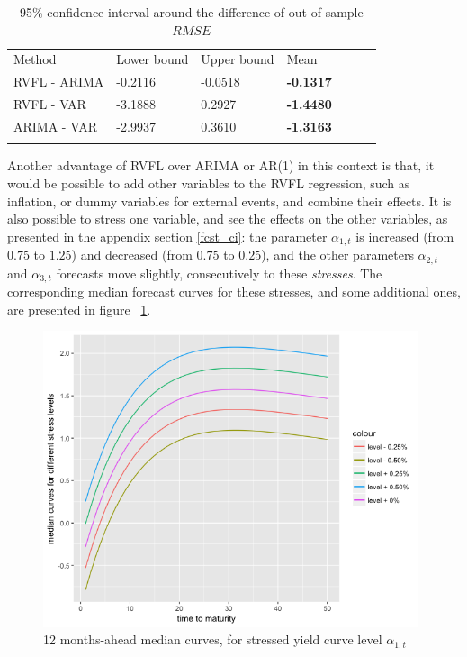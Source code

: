 \begin{table}
\begin{center}
\caption{95\% confidence interval around the difference of out-of-sample $RMSE$}
\label{tab:confint}       %
\begin{tabular}{lllllll}
\hline\noalign{\smallskip}
Method & Lower bound & Upper bound  & Mean \\
\noalign{\smallskip}\hline\noalign{\smallskip}
  RVFL - ARIMA & -0.2116 & -0.0518 & \textbf{-0.1317}\\
  RVFL - VAR & -3.1888 & 0.2927 & \textbf{-1.4480} \\
  ARIMA - VAR & -2.9937 & 0.3610 & \textbf{-1.3163} \\
\noalign{\smallskip}\hline
\end{tabular}
\end{center}
\end{table}

\medskip

Another advantage of RVFL over ARIMA or AR(1) in this context is that, it would be possible to add other variables to the RVFL regression, such as inflation, or dummy variables for external events, and combine their effects. It is also possible to stress one variable, and see the effects on the other variables, as presented in the appendix section \ref{fcst_ci}: the parameter $\alpha_{1, t}$ is increased (from $0.75$ to $1.25$) and decreased (from $0.75$ to $0.25$), and the other parameters $\alpha_{2, t}$ and $\alpha_{3, t}$ forecasts move slightly, consecutively to these \textit{stresses}. The corresponding median forecast curves for these stresses, and some additional ones, are presented in figure ~\ref{stressed_NS2}.

\begin{figure}
\centering
\includegraphics[width=11cm]{gfx/chapter-rvfl-mts/stressed_NS.png}
\caption{12 months-ahead median curves, for stressed yield curve level $\alpha_{1, t}$}
\label{stressed_NS2}
\end{figure}

